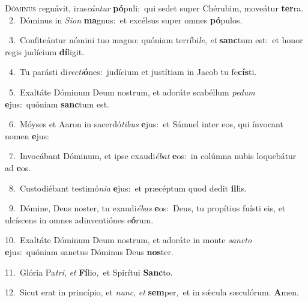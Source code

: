 \lettrine{\initial\textcolor{\initialcolor}{D}}{óminus} regnávit, iras\-\textit{cán}\-\textit{tur} \textbf{pó}\-puli:~\star qui sedet super Chérubim, moveátur \textbf{ter}\-ra.\\
{\numbfont\textcolor{\numbcolor}{~2.}}~Dóminus in \textit{Si}\-\textit{on} \textbf{ma}\-gnus:~\star et excélsus super omnes \textbf{pó}\-pulos.\par
{\numbfont\textcolor{\numbcolor}{~3.}}~Confiteántur nómini tuo magno: quóniam terríbi\-\textit{le}\-, \textit{et} \textbf{sanc}\-tum est:~\star et honor regis judícium \textbf{dí}\-ligit.\par
{\numbfont\textcolor{\numbcolor}{~4.}}~Tu parásti di\-\textit{rec}\-\textit{ti}\textbf{ó}nes:~\star judícium et justítiam in Jacob tu fe\-\textbf{cís}\-ti.\par
{\numbfont\textcolor{\numbcolor}{~5.}}~Exaltáte Dóminum Deum nostrum, et adoráte scabéllum \textit{pe}\-\textit{dum} \textbf{e}\-jus:~\star quóniam \textbf{sanc}\-tum est.\par
{\numbfont\textcolor{\numbcolor}{~6.}}~Móyses et Aaron in sacerdó\-\textit{ti}\-\textit{bus} \textbf{e}\-jus:~\star et Sámuel inter eos, qui ínvocant nomen \textbf{e}\-jus:\par
{\numbfont\textcolor{\numbcolor}{~7.}}~Invocábant Dóminum, et ipse exaudi\-\textit{é}\-\textit{bat} \textbf{e}\-os:~\star in colúmna nubis loquebátur ad \textbf{e}\-os.\par
{\numbfont\textcolor{\numbcolor}{~8.}}~Custodiébant testimó\-\textit{ni}\-\textit{a} \textbf{e}\-jus:~\star et præcéptum quod dedit \textbf{il}\-lis.\par
{\numbfont\textcolor{\numbcolor}{~9.}}~Dómine, Deus noster, tu exaudi\-\textit{é}\-\textit{bas} \textbf{e}\-os:~\star Deus, tu propítius fuísti eis, et ulcíscens in omnes adinventiónes e\-\textbf{ó}\-rum.\par
{\numbfont\textcolor{\numbcolor}{10.}}~Exaltáte Dóminum Deum nostrum, et adoráte in monte \textit{sanc}\-\textit{to} \textbf{e}\-jus:~\star quóniam sanctus Dóminus Deus \textbf{nos}\-ter.\par
{\numbfont\textcolor{\numbcolor}{11.}}~Glória Pa\-\textit{tri}\-, \textit{et} \textbf{Fí}\-lio,~\star et Spirítui \textbf{Sanc}\-to.\par
{\numbfont\textcolor{\numbcolor}{12.}}~Sicut erat in princípio, et \textit{nunc}\-, \textit{et} \textbf{sem}\-per,~\star et in sǽcula sæculórum. \textbf{A}\-men.\par
